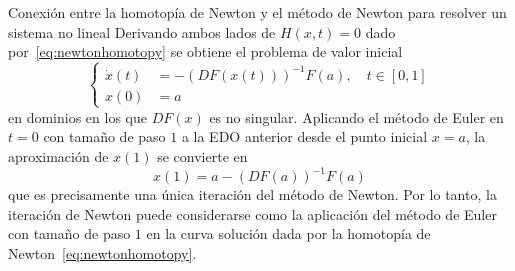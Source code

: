 \begin{frame}
	\begin{alertblock}{Conexión entre la homotopía de Newton y el método de Newton para resolver un sistema no lineal}
		Derivando ambos lados de $H\left(x,t\right)=0$ dado
		por~\eqref{eq:newtonhomotopy} se obtiene el problema de valor
		inicial
		\begin{equation*}
			\left\{
			\begin{aligned}
				\dot{x}\left(t\right) & =
				-{\left(DF\left(x\left(t\right)\right)\right)}^{-1}
				F\left(a\right),\quad t\in\left[0,1\right] \\
				x\left(0\right)       & =a
			\end{aligned}
			\right.
		\end{equation*}
		en dominios en los que $DF\left(x\right)$ es no singular.
		Aplicando el \alert{método de Euler} en $t=0$ con tamaño de paso
		$1$ a la EDO anterior desde el punto inicial $x=a$, la aproximación
		de $x\left(1\right)$ se convierte en
		\begin{equation*}
			x\left(1\right)=
			a-{\left(DF\left(a\right)\right)}^{-1}F\left(a\right)
		\end{equation*}
		que es precisamente una única iteración del método de Newton.
		Por lo tanto, la iteración de Newton puede considerarse como la
		aplicación del método de Euler con tamaño de paso $1$ en la curva
		solución dada por la homotopía de Newton~\eqref{eq:newtonhomotopy}.
	\end{alertblock}
\end{frame}